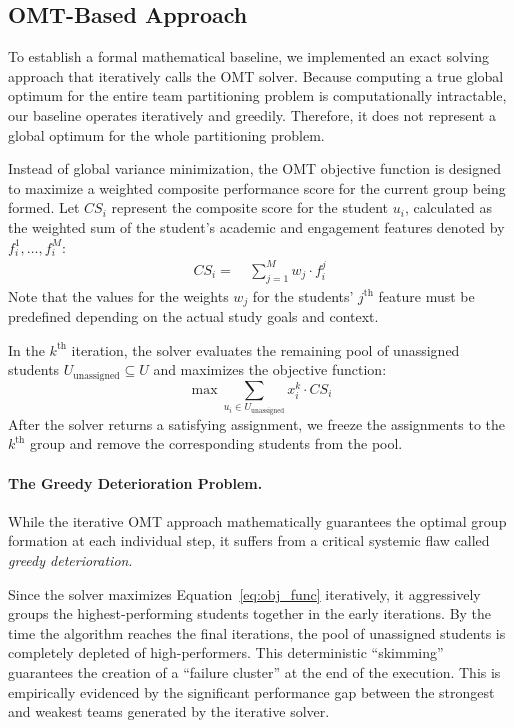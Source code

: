 \documentclass{icai2026} %
\begin{document}
\subsection{OMT-Based Approach} \label{section:omt_approach}

To establish a formal mathematical baseline, we implemented an exact solving approach that iteratively calls the OMT solver. Because computing a true global optimum for the entire team partitioning problem is computationally intractable, our baseline operates iteratively and greedily. Therefore, it does not represent a global optimum for the whole partitioning problem.

Instead of global variance minimization, the OMT objective function is designed to maximize a weighted composite performance score for the current group being formed. Let $CS_i$ represent the composite score for the student $u_i$, calculated as the weighted sum of the student's academic and engagement features denoted by $f_i^1,\dots,f_i^M$:
\begin{equation} \label{eq:composite_score}
\begin{aligned}
CS_i = \ & \sum_{j=1}^M w_j \cdot f_i^j
\end{aligned}
\end{equation}
Note that the values for the weights $w_j$ for the students' $j^{\text{th}}$ feature must be predefined depending on the actual study goals and context.

In the $k^{\text{th}}$ iteration, the solver evaluates the remaining pool of unassigned students $U_{\text{unassigned}} \subseteq U$ and maximizes the objective function:
\begin{equation} \label{eq:obj_func}
\max \sum_{u_i \in U_{\text{unassigned}}} x_i^k \cdot CS_i
\end{equation}
After the solver returns a satisfying assignment, we freeze the assignments to the $k^{\text{th}}$ group and remove the corresponding students from the pool.

\paragraph{The Greedy Deterioration Problem.}%

While the iterative OMT approach mathematically guarantees the optimal group formation at each individual step, it suffers from a critical systemic flaw called \emph{greedy deterioration}.

Since the solver maximizes Equation~\eqref{eq:obj_func} iteratively, it aggressively groups the highest-performing students together in the early iterations. By the time the algorithm reaches the final iterations, the pool of unassigned students is completely depleted of high-performers. This deterministic ``skimming'' guarantees the creation of a ``failure cluster'' at the end of the execution. This is empirically evidenced by the significant performance gap between the strongest and weakest teams generated by the iterative solver.
\end{document}
